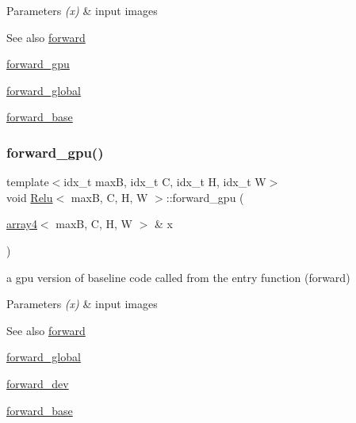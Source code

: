 \begin{DoxyParams}{Parameters}
{\em (x)} & input images \\
\hline
\end{DoxyParams}
\begin{DoxySeeAlso}{See also}
\hyperlink{structRelu_a71f8322b10508a210025151ad788226f}{forward} 

\hyperlink{structRelu_a555ae5bc02822f294cac68cf3fe94e84}{forward\+\_\+gpu} 

\hyperlink{softmaxcrossentropy_8h_a578aeeb166bd06e800d9b396eab48b35}{forward\+\_\+global} 

\hyperlink{structRelu_a41981da3c54691ae68933d5802a6518b}{forward\+\_\+base} 
\end{DoxySeeAlso}
\mbox{\label{structRelu_a555ae5bc02822f294cac68cf3fe94e84}} 
\subsubsection{\texorpdfstring{forward\+\_\+gpu()}{forward\_gpu()}}
{\footnotesize\ttfamily template$<$idx\+\_\+t maxB, idx\+\_\+t C, idx\+\_\+t H, idx\+\_\+t W$>$ \\
void \hyperlink{structRelu}{Relu}$<$ maxB, C, H, W $>$\+::forward\+\_\+gpu (\begin{DoxyParamCaption}\item[{\hyperlink{structarray4}{array4}$<$ maxB, C, H, W $>$ \&}]{x }\end{DoxyParamCaption})\hspace{0.3cm}{\ttfamily [inline]}}



a gpu version of baseline code called from the entry function (forward) 


\begin{DoxyParams}{Parameters}
{\em (x)} & input images \\
\hline
\end{DoxyParams}
\begin{DoxySeeAlso}{See also}
\hyperlink{structRelu_a71f8322b10508a210025151ad788226f}{forward} 

\hyperlink{softmaxcrossentropy_8h_a578aeeb166bd06e800d9b396eab48b35}{forward\+\_\+global} 

\hyperlink{structRelu_aba6323a49a9e24b29bbb18b27707bae8}{forward\+\_\+dev} 

\hyperlink{structRelu_a41981da3c54691ae68933d5802a6518b}{forward\+\_\+base} 
\end{DoxySeeAlso}
\mbox{\label{structRelu_af79e0373854c503faeda1928c0950b9b}} 
